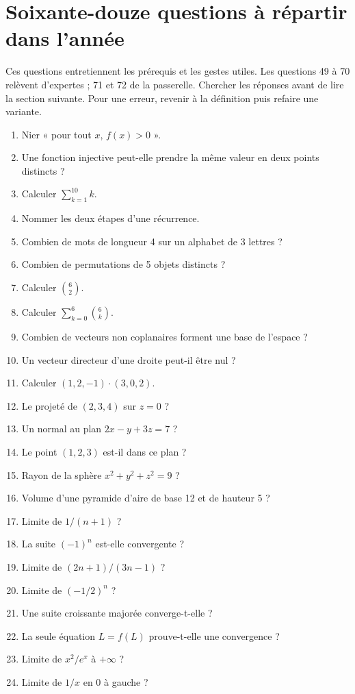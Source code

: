\section{Soixante-douze questions à répartir dans l'année}
Ces questions entretiennent les prérequis et les gestes utiles. Les questions 49 à 70 relèvent d'expertes ; 71 et 72 de la passerelle. Chercher les réponses avant de lire la section suivante. Pour une erreur, revenir à la définition puis refaire une variante.
\begin{enumerate}
\item Nier « pour tout $x$, $f(x)>0$ ».
\item Une fonction injective peut-elle prendre la même valeur en deux points distincts ?
\item Calculer $\sum_{k=1}^{10}k$.
\item Nommer les deux étapes d’une récurrence.
\item Combien de mots de longueur 4 sur un alphabet de 3 lettres ?
\item Combien de permutations de 5 objets distincts ?
\item Calculer $\binom62$.
\item Calculer $\sum_{k=0}^6\binom6k$.
\item Combien de vecteurs non coplanaires forment une base de l’espace ?
\item Un vecteur directeur d’une droite peut-il être nul ?
\item Calculer $(1,2,-1)\cdot(3,0,2)$.
\item Le projeté de $(2,3,4)$ sur $z=0$ ?
\item Un normal au plan $2x-y+3z=7$ ?
\item Le point $(1,2,3)$ est-il dans ce plan ?
\item Rayon de la sphère $x^2+y^2+z^2=9$ ?
\item Volume d’une pyramide d’aire de base 12 et de hauteur 5 ?
\item Limite de $1/(n+1)$ ?
\item La suite $(-1)^n$ est-elle convergente ?
\item Limite de $(2n+1)/(3n-1)$ ?
\item Limite de $(-1/2)^n$ ?
\item Une suite croissante majorée converge-t-elle ?
\item La seule équation $L=f(L)$ prouve-t-elle une convergence ?
\item Limite de $x^2/e^x$ à $+\infty$ ?
\item Limite de $1/x$ en $0$ à gauche ?

\end{enumerate}
